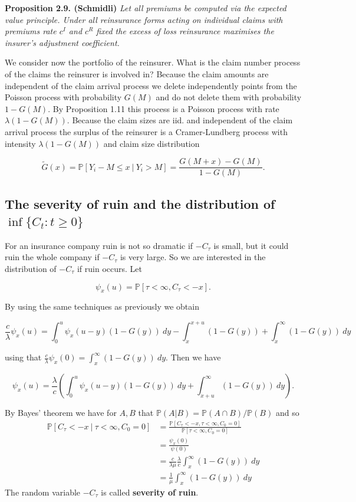 \documentclass[a4paper,10pt,openany]{book}
\begin{document}
\textbf{Proposition 2.9. (Schmidli) } \emph{Let all premiums be computed via the expected value principle. Under all reinsurance forms acting on individual claims with premiums rate \(c^I\) and \(c^R\) fixed the excess of loss reinsurance maximises the insurer's adjustment coefficient.}

We consider now the portfolio of the reinsurer. What is the claim number process of the claims the reinsurer is involved in? Because the claim amounts are independent of the claim arrival process we delete independently points from the Poisson process with probability \(G(M)\) and do not delete them with probability \(1 − G(M)\). By Proposition 1.11 this process is a Poisson process with rate \(\lambda (1 − G(M))\). Because the claim sizes are iid. and independent of the claim arrival process the surplus of the reinsurer is a Cramer-Lundberg process with intensity \(\lambda (1 − G(M))\) and claim size distribution

\[
\tilde G(x)=\mathbb P[Y_i-M\le x\ \vert\ Y_i> M]=\frac{G(M+x)-G(M)}{1-G(M)}.
\]

\hypertarget{the-severity-of-ruin-and-the-distribution-of-infc_t-t-ge-0}{%
\subsection{\texorpdfstring{The severity of ruin and the distribution of \(\inf\{C_t : t \ge 0\}\)}{The severity of ruin and the distribution of \textbackslash inf\textbackslash\{C\_t : t \textbackslash ge 0\textbackslash\}}}\label{the-severity-of-ruin-and-the-distribution-of-infc_t-t-ge-0}}

For an insurance company ruin is not so dramatic if \(−C_\tau\) is small, but it could ruin the whole company if \(−C_\tau\) is very large. So we are interested in the distribution of \(−C_\tau\) if ruin occurs. Let

\[
\psi_x(u)=\mathbb P[\tau <\infty, C_\tau <-x].
\]

By using the same techniques as previously we obtain

\[
\frac{c}{\lambda}\psi_x(u)=\int_0^u\psi_x(u-y)(1-G(y))\ dy-\int_x^{x+u}(1-G(y))+\int_x^\infty(1-G(y))\ dy
\]

using that \(\frac{c}{\lambda}\psi_x(0)=\int_x^\infty(1-G(y))\ dy\). Then we have

\[
\psi_x(u)=\frac{\lambda}{c}\left(\int_0^u\psi_x(u-y)(1-G(y))\ dy+\int_{x+u}^\infty(1-G(y))\ dy\right).
\]

By Bayes' theorem we have for \(A,B\) that \(\mathbb P(A\vert B)=\mathbb P(A\cap B)/\mathbb P(B)\) and so
\begin{align*}
\mathbb P[C_\tau <-x\ \vert\ \tau<\infty,C_0=0]&=\frac{\mathbb P[C_\tau <-x, \tau<\infty,C_0=0]}{\mathbb P[
\tau<\infty,C_0=0]}\\
&=\frac{\psi_x(0)}{\psi(0)}\\
&=\frac{c}{\lambda \mu}\frac{\lambda}{c}\int_{x}^\infty(1-G(y))\ dy\\
&=\frac{1}{\mu}\int_{x}^\infty(1-G(y))\ dy
\end{align*}
The random variable \(−C_\tau\) is called \textbf{severity of ruin}.
\end{document}
